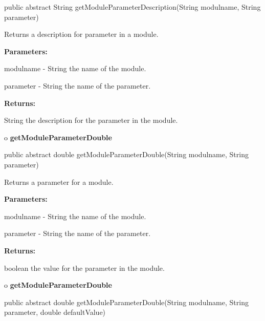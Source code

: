 \begin{PRE}
 public abstract String getModuleParameterDescription(String modulname,
                                                      String parameter)
\end{PRE}

\begin{description}
\htmlDD Returns a description for parameter in a module. 

\begin{description}
\item {\bf Parameters:}  

modulname - String the name of the module.  

parameter - String the name of the parameter.  
\item {\bf Returns:}  

String the description for the parameter in the module.  
\end{description}

\end{description}

o {\bf getModuleParameterDouble} 

\begin{PRE}
 public abstract double getModuleParameterDouble(String modulname,
                                                 String parameter)
\end{PRE}

\begin{description}
\htmlDD Returns a parameter for a module. 

\begin{description}
\item {\bf Parameters:}  

modulname - String the name of the module.  

parameter - String the name of the parameter.  
\item {\bf Returns:}  

boolean the value for the parameter in the module.  
\end{description}

\end{description}

o {\bf getModuleParameterDouble} 

\begin{PRE}
 public abstract double getModuleParameterDouble(String modulname,
                                                 String parameter,
                                                 double defaultValue)
\end{PRE}

